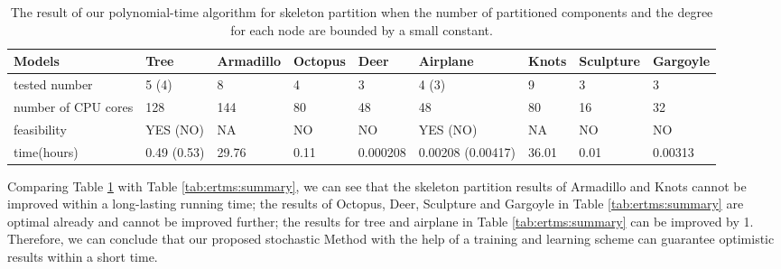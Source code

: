 \begin{table}[htb]

\begin{footnotesize}

\begin{center}

    \begin{tabular}{p{3.0cm} p{1.55cm} p{1.3cm} p{1.0cm} p{1.3cm} p{2.25cm} p{1.2cm} p{1.2cm}p{1.4cm}}

    \hline

     Models          & Tree       & Armadillo      & Octopus   & Deer      & Airplane          & Knots    &Sculpture  & Gargoyle\\ \hline
     tested number   & 5 (4)      & 8              & 4         & 3         & 4 (3)             & 9        & 3         &3 \\ \hline
     number of CPU cores &128         & 144            & 80        & 48        &48             & 80       &16         &32 \\ \hline
     feasibility     & YES (NO)   & NA             & NO        & NO        &YES (NO)           & NA       & NO        & NO  \\ \hline
     time(hours)     &0.49 (0.53) & 29.76          & 0.11      &0.000208   &0.00208 (0.00417)  & 36.01    &0.01       &0.00313 \\ \hline

    \end{tabular}

\end{center}

\end{footnotesize}

\caption{The result of our polynomial-time algorithm for skeleton partition when the number of partitioned components and the degree for each node are bounded by a small constant.}\label{tab:ertms:super}

\end{table}


Comparing Table \ref{tab:ertms:super} with Table \ref{tab:ertms:summary}, we can see that the skeleton partition results of Armadillo and Knots cannot be improved within a long-lasting running time; the results of Octopus, Deer, Sculpture and Gargoyle in Table \ref{tab:ertms:summary} are optimal already and cannot be improved further; the results for tree and airplane in Table \ref{tab:ertms:summary} can be improved by 1. Therefore, we can conclude that our proposed stochastic Method with the help of a training and learning scheme can guarantee optimistic results within a short time.

